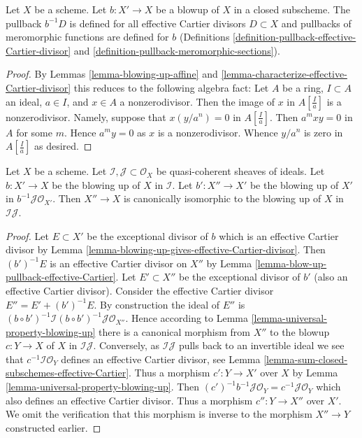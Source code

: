 \begin{lemma}
\label{lemma-blow-up-pullback-effective-Cartier}
Let $X$ be a scheme. Let $b : X' \to X$ be a blowup of $X$ in a closed
subscheme. The pullback $b^{-1}D$ is defined
for all effective Cartier divisors $D \subset X$
and pullbacks of meromorphic functions are defined for $b$
(Definitions
\ref{definition-pullback-effective-Cartier-divisor} and
\ref{definition-pullback-meromorphic-sections}).
\end{lemma}

\begin{proof}
By Lemmas \ref{lemma-blowing-up-affine} and
\ref{lemma-characterize-effective-Cartier-divisor}
this reduces to the following algebra fact:
Let $A$ be a ring, $I \subset A$ an ideal, $a \in I$, and $x \in A$
a nonzerodivisor. Then the image of $x$ in $A[\frac{I}{a}]$ is a
nonzerodivisor. Namely, suppose that $x (y/a^n) = 0$ in $A[\frac{I}{a}]$.
Then $a^mxy = 0$ in $A$ for some $m$. Hence $a^my = 0$ as $x$ is a
nonzerodivisor. Whence $y/a^n$ is zero in $A[\frac{I}{a}]$ as desired.
\end{proof}

\begin{lemma}
\label{lemma-blowing-up-two-ideals}
Let $X$ be a scheme. Let $\mathcal{I}, \mathcal{J} \subset \mathcal{O}_X$
be quasi-coherent sheaves of ideals. Let $b : X' \to X$
be the blowing up of $X$ in $\mathcal{I}$. Let $b' : X'' \to X'$ be the
blowing up of $X'$ in $b^{-1}\mathcal{J} \mathcal{O}_{X'}$. Then $X'' \to X$
is canonically isomorphic to the blowing up of $X$ in $\mathcal{I}\mathcal{J}$.
\end{lemma}

\begin{proof}
Let $E \subset X'$ be the exceptional divisor of $b$ which is an effective
Cartier divisor by
Lemma \ref{lemma-blowing-up-gives-effective-Cartier-divisor}.
Then $(b')^{-1}E$ is an effective Cartier divisor on $X''$ by
Lemma \ref{lemma-blow-up-pullback-effective-Cartier}.
Let $E' \subset X''$ be the exceptional divisor of $b'$ (also an effective
Cartier divisor). Consider the effective Cartier divisor
$E'' = E' + (b')^{-1}E$. By construction the ideal of $E''$ is
$(b \circ b')^{-1}\mathcal{I} (b \circ b')^{-1}\mathcal{J} \mathcal{O}_{X''}$.
Hence according to Lemma \ref{lemma-universal-property-blowing-up}
there is a canonical morphism from $X''$ to the blowup $c : Y \to X$
of $X$ in $\mathcal{I}\mathcal{J}$. Conversely, as $\mathcal{I}\mathcal{J}$
pulls back to an invertible ideal we see that
$c^{-1}\mathcal{I}\mathcal{O}_Y$ defines
an effective Cartier divisor, see
Lemma \ref{lemma-sum-closed-subschemes-effective-Cartier}.
Thus a morphism $c' : Y \to X'$ over $X$ by
Lemma \ref{lemma-universal-property-blowing-up}.
Then $(c')^{-1}b^{-1}\mathcal{J}\mathcal{O}_Y = c^{-1}\mathcal{J}\mathcal{O}_Y$
which also defines an effective Cartier divisor. Thus a morphism
$c'' : Y \to X''$ over $X'$. We omit the verification that this
morphism is inverse to the morphism $X'' \to Y$ constructed earlier.
\end{proof}

